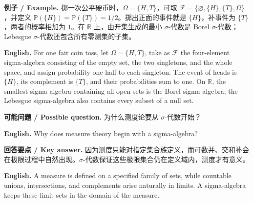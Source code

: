 \documentclass[UTF8,11pt,a4paper]{ctexart}
\newcommand{\EN}[1]{\par\noindent\textbf{English.} #1\par}
\newcommand{\EX}[2]{\par\noindent\textbf{例子 / Example.} #1\par\EN{#2}}
\newcommand{\ASK}[4]{\par\noindent\textbf{可能问题 / Possible question.} #1\par\EN{#2}\noindent\textbf{回答要点 / Key answer.} #3\par\EN{#4}\medskip}
\begin{document}
\EX{掷一次公平硬币时，$\Omega=\{H,T\}$，可取 $\mathcal F=\{\varnothing,\{H\},\{T\},\Omega\}$，并定义 $\mathbb P(\{H\})=\mathbb P(\{T\})=1/2$。掷出正面的事件就是 $\{H\}$，补事件为 $\{T\}$，两者的概率相加为 $1$。在 $\mathbb R$ 上，由开集生成的最小 $\sigma$-代数是 Borel $\sigma$-代数；Lebesgue $\sigma$-代数还包含所有零测集的子集。}{For one fair coin toss, let $\Omega=\{H,T\}$, take as $\mathcal F$ the four-element sigma-algebra consisting of the empty set, the two singletons, and the whole space, and assign probability one half to each singleton. The event of heads is $\{H\}$, its complement is $\{T\}$, and their probabilities sum to one. On $\mathbb R$, the smallest sigma-algebra containing all open sets is the Borel sigma-algebra; the Lebesgue sigma-algebra also contains every subset of a null set.}
\ASK{为什么测度论要从 $\sigma$-代数开始？}{Why does measure theory begin with a sigma-algebra?}{因为测度只能对指定集合族定义，而可数并、交和补会在极限过程中自然出现。$\sigma$-代数保证这些极限集合仍在定义域内，测度才有意义。}{A measure is defined on a specified family of sets, while countable unions, intersections, and complements arise naturally in limits. A sigma-algebra keeps these limit sets in the domain of the measure.}
\end{document}

